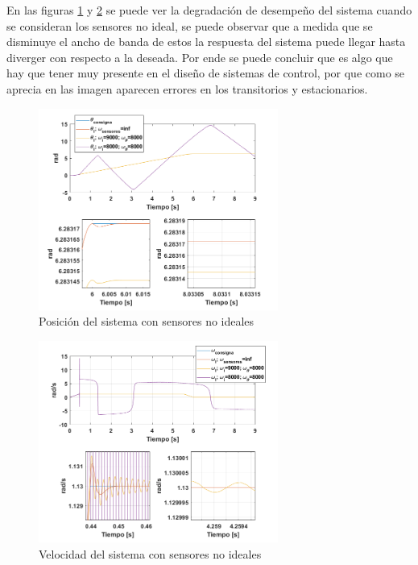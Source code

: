\documentclass[10pt]{article}
\begin{document}
\begin{itemize}
En las figuras \ref{fig:theta_consignas} y \ref{fig:omega_sensores} se puede ver la degradación de desempeño del sistema cuando se consideran los sensores no ideal, se puede observar que a medida que se disminuye el ancho de banda de estos
 la respuesta del sistema puede llegar hasta diverger con respecto a la deseada. Por ende se puede concluir que es algo que hay que tener muy presente en el diseño de sistemas de control, por que como se 
 aprecia en las imagen aparecen errores en los transitorios y estacionarios.
 \begin{figure}[h!]
	\centering
	\includegraphics[width=0.7\textwidth]{theta_consignas.png}
	\caption{\label{fig:theta_consignas}Posición del sistema con sensores no ideales}
	\end{figure}
 \begin{figure}[h!]
	\centering
	\includegraphics[width=0.7\textwidth]{omega_sensores.png}
	\caption{\label{fig:omega_sensores}Velocidad del sistema con sensores no ideales}
	\end{figure}

\end{itemize}
\end{document}
